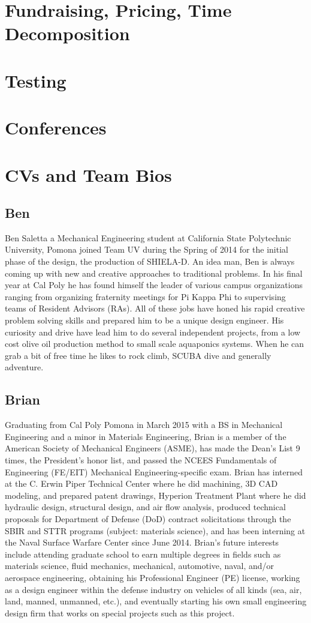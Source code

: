 \documentclass{report}
\begin{document}
\section{Fundraising, Pricing, Time Decomposition}
\section{Testing}
\section{Conferences}
\section{CVs and Team Bios}
\subsection{Ben}
Ben Saletta a Mechanical Engineering student at California State Polytechnic University, Pomona joined Team UV during the Spring of 2014 for the initial phase of the design, the production of SHIELA-D. An idea man, Ben is always coming up with new and creative approaches to  traditional problems.  In his final year at Cal Poly he has found himself the leader of various campus organizations ranging from organizing fraternity meetings for Pi Kappa Phi to supervising teams of Resident Advisors (RAs).  All of these jobs have honed his rapid creative problem solving skills and prepared him to be a unique design engineer.  His curiosity and drive have lead him to do several independent projects, from a low cost olive oil production method to small scale aquaponics systems.  When he can grab a bit of free time he likes to rock climb, SCUBA dive and generally adventure.
\subsection{Brian}
Graduating from Cal Poly Pomona in March 2015 with a BS in Mechanical Engineering and a minor in Materials Engineering, Brian is a member of the American Society of Mechanical Engineers (ASME), has made the Dean’s List 9 times, the President’s honor list, and passed the NCEES Fundamentals of Engineering (FE/EIT) Mechanical Engineering-specific exam.  Brian has interned at the C. Erwin Piper Technical Center where he did machining, 3D CAD modeling, and prepared patent drawings, Hyperion Treatment Plant where he did hydraulic design, structural design, and air flow analysis, produced technical proposals for Department of Defense (DoD) contract solicitations through the SBIR and STTR programs (subject: materials science), and has been interning at the Naval Surface Warfare Center since June 2014.  Brian’s future interests include attending graduate school to earn multiple degrees in fields such as materials science, fluid mechanics, mechanical, automotive, naval, and/or aerospace engineering, obtaining his Professional Engineer (PE) license, working as a design engineer within the defense industry on vehicles of all kinds (sea, air, land, manned, unmanned, etc.), and eventually starting his own small engineering design firm that works on special projects such as this project.
\end{document}
